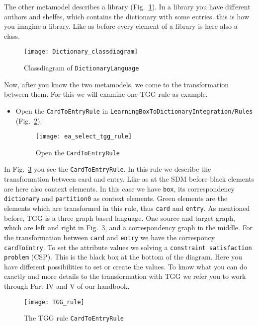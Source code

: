 The other metamodel describes a library (Fig.~\ref{ea:classdiagram_DictionaryLanguage}). In a library you have different authors and shelfes, which contains the dictionary with some entries. this is how you imagine a library. Like as before every element of a library is here also a class.

\begin{figure}[htbp]
	\centering
  \texttt{[image: Dictionary\_classdiagram]}
	\caption{Classdiagram of \texttt{Dictionary\-Language}} 
	\label{ea:classdiagram_DictionaryLanguage} 
\end{figure}

Now, after you know the two metamodels, we come to the transformation between them. For this we will examine one TGG rule as example.

\begin{itemize}

\item Open the \texttt{CardToEntryRule} in \texttt{Learning\-Box\-To\-Dictionary\-Integra\-tion/\-Rules} (Fig.~\ref{ea:openTGG_rule}).

\begin{figure}[htbp]
	\centering
  \texttt{[image: ea\_select\_tgg\_rule]}
	\caption{Open the \texttt{CardToEntryRule}} 
	\label{ea:openTGG_rule} 
\end{figure}

\end{itemize}

\newpage %
In Fig.~\ref{ea:TGG_rule} you see the \texttt{Card\-To\-Entry\-Rule}. In this rule we describe the transformation between card and entry. Like as at the SDM before black elements are here also context elements. In this case we have \texttt{box}, its correspondency \texttt{dictionary} and \texttt{partition0} as context elements. Green elements are the elements which are transformed in this rule, thus \texttt{card} and \texttt{entry}.
\newline
As mentioned before, TGG is a three graph based language. One source and target graph, which are left and right in Fig.~\ref{ea:TGG_rule}, and a correspondency graph in the middle. For the transformation between \texttt{card} and \texttt{entry} we have the corresponcy \texttt{cardToEntry}.
\newline
To set the attribute values we solving a \texttt{constraint satisfaction problem} (CSP). This is the black box at the bottom of the diagram. Here you have different possibilities to set or create the values. To know what you can do exactly and more details to the transformation with TGG we refer you to work through Part IV and V of our handbook.

\begin{figure}[htbp]
	\centering
  \texttt{[image: TGG\_rule]}
	\caption{The TGG rule \texttt{CardToEntryRule}} 
	\label{ea:TGG_rule} 
\end{figure}